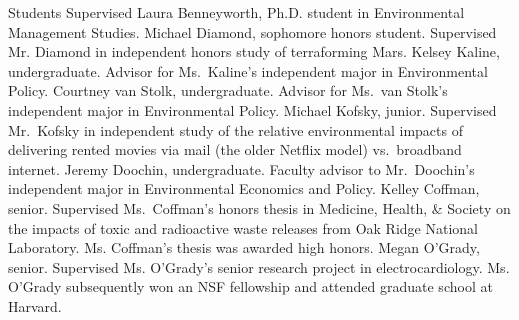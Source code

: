 %
%
\begin{rubric}{Students Supervised}%
\entry*[2011--] Laura Benneyworth, Ph.D. student in Environmental Management Studies.
\entry*[2012] Michael Diamond, sophomore honors student. Supervised Mr. Diamond in independent honors study of terraforming Mars.
\entry*[2011--2013] Kelsey Kaline, undergraduate. Advisor for Ms.~Kaline's independent major in Environmental Policy.
\entry*[2011--2013] Courtney van Stolk, undergraduate. Advisor for Ms.~van Stolk's independent major in Environmental Policy.
\entry*[2010--2011]Michael Kofsky, junior. Supervised Mr.~Kofsky in independent study of the relative environmental impacts of delivering rented movies via mail (the older Netflix model) vs.\ broadband internet.
\entry*[2008--2010] Jeremy Doochin, undergraduate. Faculty advisor to Mr.~Doochin's independent major in Environmental Economics and Policy.
\entry*[2008--2009] Kelley Coffman, senior. Supervised Ms.~Coffman's honors thesis in Medicine, Health, \& Society on the impacts of toxic and radioactive waste releases from Oak Ridge National Laboratory. Ms. Coffman's thesis was awarded high honors.
\entry*[2002--2003]Megan O'Grady, senior. Supervised Ms. O'Grady's senior research project in electrocardiology. Ms. O'Grady subsequently won an NSF fellowship and attended graduate school at Harvard.
\end{rubric}
